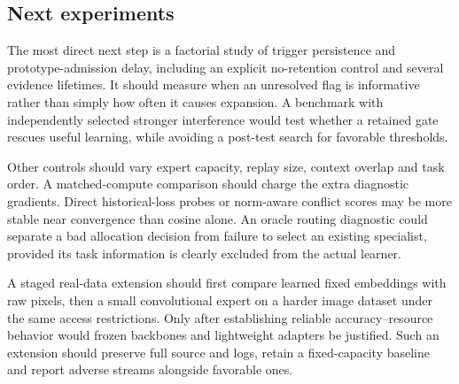 \subsection{Next experiments}
The most direct next step is a factorial study of trigger persistence and prototype-admission delay, including an explicit no-retention control and several evidence lifetimes. It should measure when an unresolved flag is informative rather than simply how often it causes expansion. A benchmark with independently selected stronger interference would test whether a retained gate rescues useful learning, while avoiding a post-test search for favorable thresholds.

Other controls should vary expert capacity, replay size, context overlap and task order. A matched-compute comparison should charge the extra diagnostic gradients. Direct historical-loss probes or norm-aware conflict scores may be more stable near convergence than cosine alone. An oracle routing diagnostic could separate a bad allocation decision from failure to select an existing specialist, provided its task information is clearly excluded from the actual learner.

A staged real-data extension should first compare learned fixed embeddings with raw pixels, then a small convolutional expert on a harder image dataset under the same access restrictions. Only after establishing reliable accuracy--resource behavior would frozen backbones and lightweight adapters be justified. Such an extension should preserve full source and logs, retain a fixed-capacity baseline and report adverse streams alongside favorable ones.
